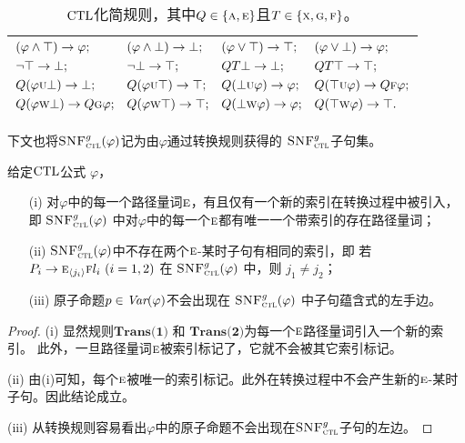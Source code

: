 \begin{table}[h!]%
	\centering\caption{$\textrm{CTL}$化简规则，其中$Q\in \{\textsc{a}, \textsc{e}\}$且$T\in \{\textsc{x},\textsc{g},\textsc{f}\}$。}\label{tab:simp}
	\begin{tabular}{c}
		\toprule
		$
		\begin{aligned}
			& (\varphi \wedge \top) \rightarrow \varphi;
			&&	(\varphi \wedge \bot) \rightarrow \bot;
			&&  (\varphi \vee \top) \rightarrow \top;
			&& (\varphi \vee \bot) \rightarrow \varphi; \\
			&  \neg \top \rightarrow \bot; 
			&& \neg \bot \rightarrow \top; 
			&&  QT \bot \rightarrow \bot; 
			&& QT \top \rightarrow \top;  \\
			& Q(\varphi \textsc{u} \bot) \rightarrow \bot;
			&& Q(\varphi \textsc{u} \top) \rightarrow \top;
			&& Q(\bot \textsc{u} \varphi) \rightarrow \varphi;
			&& Q(\top \textsc{u} \varphi) \rightarrow Q\textsc{f} \varphi;\\
			& Q(\varphi \textsc{w} \bot) \rightarrow Q\textsc{g} \varphi;
			&& Q(\varphi \textsc{w} \top) \rightarrow \top; 
			&& Q(\bot \textsc{w} \varphi) \rightarrow \varphi;
			&& Q(\top \textsc{w} \varphi) \rightarrow \top.
		\end{aligned}
		$\\
		\bottomrule
	\end{tabular}
\end{table}

下文也将${\textsc{SNF}_{\textsc{ctl}}^g}(\varphi)$记为由$\varphi$通过转换规则获得的 ${\textsc{SNF}_{\textsc{ctl}}^g}$子句集。


\begin{lemma} \label{lem:ResTransPt}
	给定$\textrm{CTL}$公式 $\varphi$，
	\begin{itemize}
		\item[(i)] 对$\varphi$中的每一个路径量词$\textsc{e}$，有且仅有一个新的索引在转换过程中被引入，即 ${\textsc{SNF}_{\textsc{ctl}}^g}(\varphi)$ 中对$\varphi$中的每一个$\textsc{e}$都有唯一一个带索引的存在路径量词；
		\item[(ii)] ${\textsc{SNF}_{\textsc{ctl}}^g}(\varphi)$中不存在两个$\textsc{e}$-某时子句有相同的索引，即
		若 $P_i\rightarrow \textsc{e}_{{\langle{j_i}\rangle}}\textsc{f} l_i~(i=1,2)$ 在 ${\textsc{SNF}_{\textsc{ctl}}^g}(\varphi)$ 中，则
		$j_1\neq j_2$；
		\item[(iii)] 原子命题$p \in\textit{Var}(\varphi)$不会出现在 ${\textsc{SNF}_{\textsc{ctl}}^g}(\varphi)$ 中子句蕴含式的左手边。
	\end{itemize}
\end{lemma}
\begin{proof}
	(i) 显然规则$\textbf{Trans(1)}$ 和 $\textbf{Trans(2)}$为每一个$\textsc{e}$路径量词引入一个新的索引。 
	此外，一旦路径量词$\textsc{e}$被索引标记了，它就不会被其它索引标记。
	
	(ii) 由(i)可知，每个$\textsc{e}$被唯一的索引标记。此外在转换过程中不会产生新的$\textsc{e}$-某时子句。因此结论成立。
	
	(iii) 从转换规则容易看出$\varphi$中的原子命题不会出现在${\textsc{SNF}_{\textsc{ctl}}^g}$子句的左边。
\end{proof}

